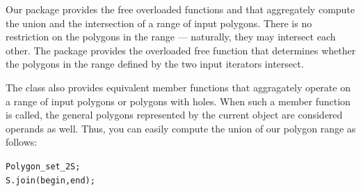 Our package provides the free overloaded functions  and
 that aggregately compute the union and the intersection
of a range of input polygons. There is no restriction on the polygons in the
range --- naturally, they may intersect each other.
The package provides the overloaded free function 
 that determines whether the polygons in the
range defined by the two input iterators \ccc{[begin, end)} intersect.

The class  also provides equivalent member
functions that aggragately operate on a range of input polygons or
polygons with holes. When such a member function is called, the general 
polygons represented by the current object are considered operands as 
well. Thus, you can easily compute the union of our polygon range as
follows:
\begin{alltt}
  Polygon_set_2 S;
  S.join (begin, end);
\end{alltt} 
